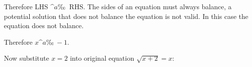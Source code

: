 {\begin{mdframed}[linewidth=4, leftmargin=40, rightmargin=40]
\begin{exercise}
\begin{enumerate}[noitemsep, label=\textbf{Step} \textbf{\arabic*}. ]
        
        \label{m39247*id152286}Therefore LHS \begin{math}\^{a}‰~\end{math} RHS. The sides of an equation must always balance, a potential solution that does not balance the equation is not valid. In this case the equation does not balance.\par 
        \label{m39247*id152303}Therefore \begin{math}x\^{a}‰~-1\end{math}.\par 
        \label{m39247*id152325}Now substitute \begin{math}x=2\end{math} into original equation \begin{math}\sqrt{x+2}=x\end{math}:\par 
        \label{m39247*id152365}\nopagebreak\noindent{}
    

\end{enumerate}
\end{exercise}
\end{mdframed}}
